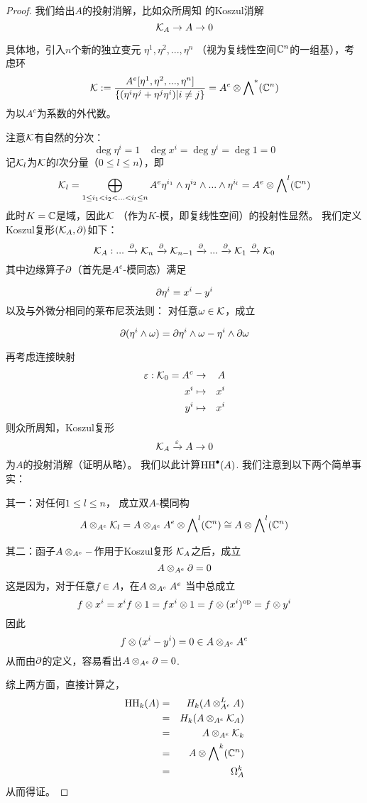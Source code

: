 \begin{proof}

我们给出$A$的投射消解，比如众所周知
的Koszul消解$$\mathcal{K}_A\to A\to 0$$

具体地，引入$n$个新的独立变元
$\eta^1,\eta^2,...,\eta^n$
（视为复线性空间$\mathbb{C}^n$的一组基），考虑环
$$\mathcal{K}:=\frac{A^e[\eta^1,\eta^2,...,\eta^n]}
               {\{(\eta^i\eta^j+\eta^j\eta^i)|i\neq j\}}
         =A^e\otimes\bigwedge\nolimits^ *(\mathbb{C}^n)$$
为以$A^e$为系数的外代数。

注意$\mathcal{K}$有自然的分次：
$$\deg\eta^i=1\,\,\,\,\,\deg x^i=\deg y^i=\deg 1=0$$
记$\mathcal{K}_l$为$\mathcal{K}$的$l$次分量（$0\leq l\leq n$），即
$$
\mathcal{K}_l=\bigoplus_{1\leq {i_1}<{i_2}<...<{i_l}\leq n}
          A^e\eta^{i_1}\wedge\eta^{i_2}\wedge...\wedge\eta^{i_l}
        =A^e\otimes\bigwedge\nolimits^ l(\mathbb{C}^n)$$
此时$K=\mathbb{C}$是域，因此$\mathcal{K}$
（作为$K$-模，即复线性空间）的投射性显然。
我们定义Koszul复形$(\mathcal{K}_A,\partial)$如下：
$$\mathcal{K}_A:...\xrightarrow{\partial} \mathcal{K}_n\xrightarrow{\partial}\mathcal{K}_{n-1}
\xrightarrow{\partial}...\xrightarrow{\partial}\mathcal{K}_1\xrightarrow{\partial}\mathcal{K}_0$$
其中边缘算子$\partial$（首先是$A^e$-模同态）满足

$$\partial\eta^i= x^i-y^i$$
以及与外微分相同的莱布尼茨法则：
对任意$\omega\in\mathcal{K}$，成立

$$\partial(\eta^i\wedge\omega)=
\partial\eta^i\wedge\omega-\eta^i\wedge\partial\omega$$

再考虑连接映射
\begin{eqnarray*}
\varepsilon:\mathcal{K}_0=A^c&\to& A\\
x^i&\mapsto&x^i\\
y^i&\mapsto&x^i\\
\end{eqnarray*}
则众所周知，Koszul复形
$$\mathcal{K}_A\xrightarrow{\varepsilon} A\to 0$$
为$A$的投射消解（证明从略）。
我们以此计算$\operatorname{HH}^{\bullet}(A)$.
我们注意到以下两个简单事实：

其一：对任何$1\leq l\leq n$，
成立双$A$-模同构
$$A\otimes_{A^e}\mathcal{K}_l=
A\otimes_{A^e}A^e\otimes\bigwedge\nolimits^ l(\mathbb{C}^n)
\cong A\otimes\bigwedge\nolimits^ l(\mathbb{C}^n)$$

其二：函子$A\otimes_{A^e}-$作用于Koszul复形
$\mathcal{K}_A$之后，成立
$$A\otimes_{A^e}\partial=0$$
这是因为，对于任意$f\in A$，在$A\otimes_{A^e}A^e$
当中总成立
$$f\otimes x^i=x^if\otimes 1
=fx^i\otimes 1=f\otimes (x^i)^{\text{op}}=f\otimes y^i$$
因此
$$f\otimes(x^i-y^i)=0\in
A\otimes_{A^e}A^e$$
从而由$\partial$的定义，容易看出$A\otimes_{A^e}\partial=0$.\vs

综上两方面，直接计算之，
\begin{eqnarray*}
\operatorname{HH}_k(A)&=&H_k(A\otimes_{A^e}^LA)\\
&=&H_k(A\otimes_{A^e}\mathcal{K}_A)\\
&=&A\otimes_{A^e}\mathcal{K}_k\\
&=&A\otimes\bigwedge\nolimits^ k(\mathbb{C}^n)\\
&=&\Omega^k_A
\end{eqnarray*}
从而得证。
\end{proof}

